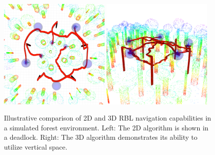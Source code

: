             \begin{figure}[htbp]
                \centering
                \includegraphics[width=0.48\textwidth]{./fig/rviz/circular_forest_fail.png}
                \includegraphics[width=0.48\textwidth]{./fig/rviz/3d_crossing_circle_forest.png}
                \caption{
                    Illustrative comparison of 2D and 3D RBL navigation capabilities in a simulated forest environment. 
                    Left: The 2D algorithm is shown in a deadlock. 
                    Right: The 3D algorithm demonstrates its ability to utilize vertical space.
                }
                \label{fig:forest_crossing_circle}
            \end{figure}

